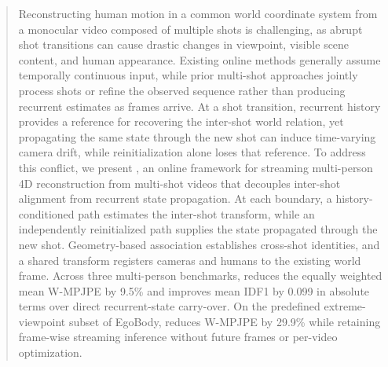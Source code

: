 \begin{abstract}
Reconstructing human motion in a common world coordinate system from a
monocular video composed of multiple shots is challenging, as abrupt shot
transitions can cause drastic changes in viewpoint, visible scene content,
and human appearance. Existing online methods generally assume temporally
continuous input, while prior multi-shot approaches jointly process shots or
refine the observed sequence rather than producing recurrent estimates as
frames arrive. At a shot transition, recurrent history provides a reference
for recovering the inter-shot world relation, yet propagating the same state
through the new shot can induce time-varying camera drift, while
reinitialization alone loses that reference. To address this conflict, we present \method{}, an online framework
for streaming multi-person 4D reconstruction from multi-shot videos that
decouples inter-shot alignment from recurrent state propagation.
At each boundary, a history-conditioned path estimates the inter-shot
transform, while an independently reinitialized path supplies the state
propagated through the new shot. Geometry-based association establishes
cross-shot identities, and a shared transform registers cameras and humans to
the existing world frame.
Across three multi-person benchmarks, \method{} reduces the
equally weighted mean W-MPJPE by 9.5\% and improves mean IDF1 by 0.099 in
absolute terms over direct recurrent-state carry-over. On the predefined
extreme-viewpoint subset of EgoBody, \method{} reduces W-MPJPE by 29.9\%
while retaining frame-wise streaming inference without future frames or
per-video optimization.
\end{abstract}
